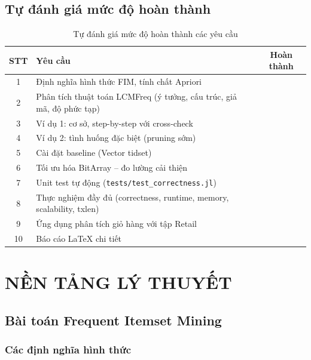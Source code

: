 \documentclass[12pt,a4paper]{article}
\newcommand{\cmark}{\ding{51}}
\theoremstyle{definition}
\begin{document}
\subsection{Tự đánh giá mức độ hoàn thành}

\begin{table}[H]
\centering
\small
\begin{tabular}{c p{10cm} c}
    \toprule
    \textbf{STT} & \textbf{Yêu cầu} & \textbf{Hoàn thành} \\
    \midrule
    1  & Định nghĩa hình thức FIM, tính chất Apriori & \cmark \\
    2  & Phân tích thuật toán LCMFreq (ý tưởng, cấu trúc, giả mã, độ phức tạp) & \cmark \\
    3  & Ví dụ 1: cơ sở, step-by-step với cross-check & \cmark \\
    4  & Ví dụ 2: tình huống đặc biệt (pruning sớm) & \cmark \\
    5  & Cài đặt baseline (Vector tidset) & \cmark \\
    6  & Tối ưu hóa BitArray -- đo lường cải thiện & \cmark \\
    7  & Unit test tự động (\texttt{tests/test\_correctness.jl}) & \cmark \\
    8  & Thực nghiệm đầy đủ (correctness, runtime, memory, scalability, txlen) & \cmark \\
    9  & Ứng dụng phân tích giỏ hàng với tập Retail & \cmark \\
    10 & Báo cáo \LaTeX{} chi tiết & \cmark \\
    \bottomrule
\end{tabular}
\caption{Tự đánh giá mức độ hoàn thành các yêu cầu}
\label{tab:self_eval}
\end{table}


\section{NỀN TẢNG LÝ THUYẾT}

\subsection{Bài toán Frequent Itemset Mining}

\subsubsection{Các định nghĩa hình thức}
\end{document}
